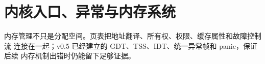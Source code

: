 \chapter{内核入口、异常与内存系统}

\begin{keyidea}
内存管理不只是分配空间。页表把地址翻译、所有权、权限、缓存属性和故障控制流
连接在一起；v0.5 已经建立的 GDT、TSS、IDT、统一异常帧和 panic，保证后续
内存机制出错时仍能留下足够证据。
\end{keyidea}



